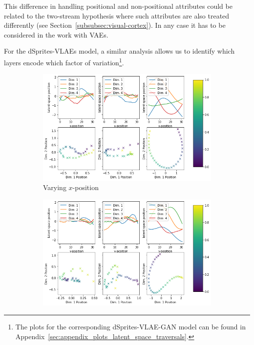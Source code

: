 This difference in handling positional and non-positional attributes could be related to the two-stream hypothesis where such attributes are also treated differently (see Section~\ref{subsubsec:visual-cortex}).
In any case it has to be considered in the work with \acp{VAE}.

For the dSprites-\acp{VLAE} model, a similar analysis allows us to identify which layers encode which factor of variation\footnote{The plots for the corresponding dSprites-\ac{VLAE}-\ac{GAN} model can be found in Appendix~\ref{sec:appendix_plots_latent_space_traversals}.}.
\begin{figure}
    \centering
    \begin{subfigure}{.48\textwidth}
        \centering
        \includegraphics[width=\textwidth]{images/latent_space_traversals/vlae_dsprites_left_latent_space_values.png}
        \caption{Varying $x$-position}
        \label{subfig:vlae_dsprites_latent_space_values_x}
    \end{subfigure}
    \hfill
    \begin{subfigure}{.48\textwidth}
        \centering
        \includegraphics[width=\textwidth]{images/latent_space_traversals/vlae_dsprites_bottom_latent_space_values.png}

\end{subfigure}
\end{figure}
